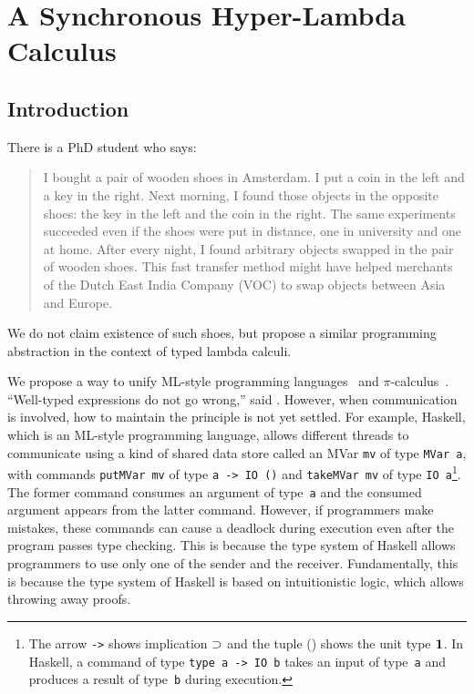 \chapter{A Synchronous Hyper-Lambda Calculus}
\label{ch:exchange}

\section{Introduction}

There is a PhD student who says:
\begin{quotation}
 I bought a pair of wooden shoes in Amsterdam.  I put
 a coin in the left and a key in the right.
 Next morning, I found those objects in the opposite shoes:
 the key in the left and the coin in the right.
 The same experiments succeeded even if the shoes were put in distance, one in
 university and one at home.  After every night, I found arbitrary objects swapped in
 the pair of wooden shoes.
 This fast transfer method might have helped merchants of
 the Dutch East India Company (VOC) to swap objects between Asia and Europe.
\end{quotation}
We do not claim existence of such shoes, but propose
a similar programming abstraction in the context of typed lambda calculi.

We propose a way to unify ML-style programming
languages~\citep{milner1997definition, marlow2010haskell} and
$\pi$-calculus~\citep{milner1999communicating}.
``Well-typed expressions do not go wrong,'' said \citet{milner1978}.
However, when communication is involved, how to maintain the principle
is not yet settled.
For example, Haskell, which is an ML-style programming language,
allows different threads to communicate using a kind of shared data
store called an MVar \texttt{mv} of
type \texttt{MVar
a}, with commands
\texttt{putMVar mv} of type \texttt{a -> IO ()} and \texttt{takeMVar mv}
of type \texttt{IO
a}\footnote{The arrow \texttt{->} shows implication $\supset$ and the tuple
() shows the unit type $\mathbf{1}$.  In Haskell, a command of type
\texttt{type a -> IO b} takes an input of type~\texttt{a} and produces a
result of type~\texttt{b} during execution.}.
The former command consumes an argument of type~\texttt{a} and
the consumed argument appears from the latter command.
However, if programmers make mistakes, these commands can
cause a deadlock during execution even after the program passes type
checking.
This is because the type system of Haskell allows programmers to
use only one of the sender and the receiver.
Fundamentally, this is because the type system of Haskell
is based on intuitionistic logic, which allows throwing away proofs.

